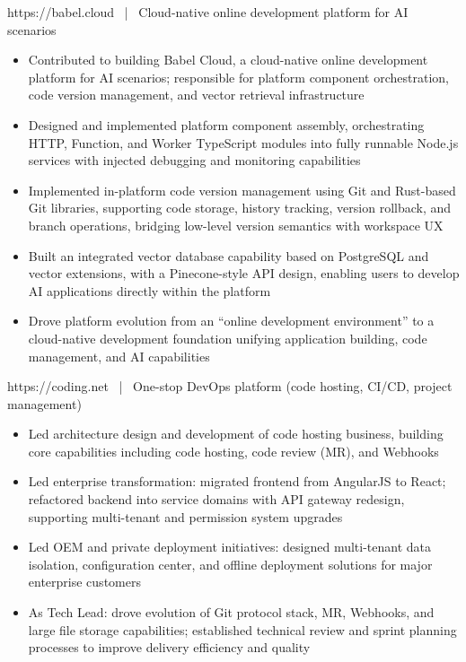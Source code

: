 \documentclass{resume}
\begin{document}
https://babel.cloud \ | \ Cloud-native online development platform for AI scenarios
\begin{onehalfspacing}
\begin{itemize}
  \item Contributed to building Babel Cloud, a cloud-native online development platform for AI scenarios; responsible for platform component orchestration, code version management, and vector retrieval infrastructure
  \item Designed and implemented platform component assembly, orchestrating HTTP, Function, and Worker TypeScript modules into fully runnable Node.js services with injected debugging and monitoring capabilities
  \item Implemented in-platform code version management using Git and Rust-based Git libraries, supporting code storage, history tracking, version rollback, and branch operations, bridging low-level version semantics with workspace UX
  \item Built an integrated vector database capability based on PostgreSQL and vector extensions, with a Pinecone-style API design, enabling users to develop AI applications directly within the platform
  \item Drove platform evolution from an ``online development environment'' to a cloud-native development foundation unifying application building, code management, and AI capabilities
\end{itemize}
\end{onehalfspacing}

https://coding.net \ | \ One-stop DevOps platform (code hosting, CI/CD, project management)
\begin{onehalfspacing}
\begin{itemize}
  \item Led architecture design and development of code hosting business, building core capabilities including code hosting, code review (MR), and Webhooks
  \item Led enterprise transformation: migrated frontend from AngularJS to React; refactored backend into service domains with API gateway redesign, supporting multi-tenant and permission system upgrades
  \item Led OEM and private deployment initiatives: designed multi-tenant data isolation, configuration center, and offline deployment solutions for major enterprise customers
  \item As Tech Lead: drove evolution of Git protocol stack, MR, Webhooks, and large file storage capabilities; established technical review and sprint planning processes to improve delivery efficiency and quality
\end{itemize}
\end{onehalfspacing}
\end{document}
